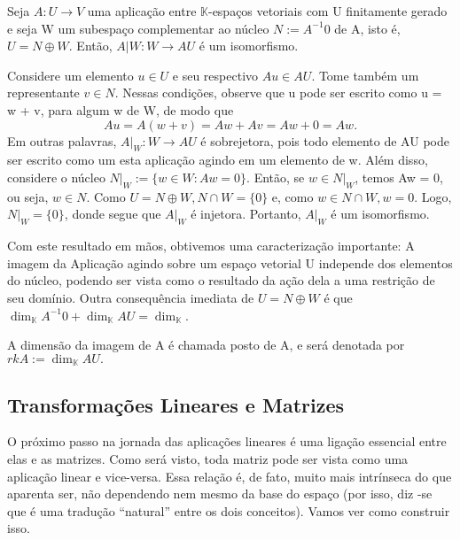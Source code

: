 \begin{proposition*}
    Seja $A:U\rightarrow{V}$ uma aplica\c c\~ao entre $\mathbb{K}$-espa\c cos vetoriais com U finitamente gerado e 
    seja W um subespa\c co complementar ao n\'ucleo $N:= A^{-1}0$ de A, isto \'e, $U = N \oplus W$. Ent\~ao, 
    $A|W: W \rightarrow AU$ \'e um isomorfismo.
\end{proposition*}
\begin{proof*}
    Considere um elemento $u\in{U}$ e seu respectivo $Au\in{AU}$. Tome tamb\'em um representante $v\in{N}$. Nessas
    condi\c c\~oes, observe que u pode ser escrito como u = w + v, para algum w de W, de modo que 
    $$
        Au = A(w + v) = Aw + Av = Aw + 0 = Aw.
    $$
    Em outras palavras, $A|_W: W\rightarrow AU$ \'e sobrejetora, pois todo elemento de AU pode ser escrito como
    um esta aplica\c c\~ao agindo em um elemento de w. Al\'em disso, considere o n\'ucleo $N|_W:=\{w\in{W}: Aw = 0\}.$
    Ent\~ao, se $w\in{N|_W}$, temos Aw = 0, ou seja, $w\in{N}.$ Como $U = N\oplus{W}, N\cap{W} = \{0\}$ e, como 
    $w\in{N\cap{W}}, w = 0.$ Logo, $N|_W = \{0\}$, donde segue que $A|_W$ \'e injetora. Portanto, $A|_W$ \'e um
    isomorfismo.
    \qedsymbol 
\end{proof*}
    Com este resultado em m\~aos, obtivemos uma caracteriza\c c\~ao importante: A imagem da Aplica\c c\~ao agindo
sobre um espa\c co vetorial U independe dos elementos do n\'ucleo, podendo ser vista como o resultado da a\c c\~ao
dela a uma restri\c c\~ao de seu dom\'inio. Outra consequ\^encia imediata de $U = N \oplus{W}$ \'e que 
$\dim_{\mathbb{K}}A^{-1}0 + \dim_{\mathbb{K}} AU = \dim_{\mathbb{K}}$.
\begin{def*}
    A dimens\~ao da imagem de A \'e chamada posto de A, e ser\'a denotada por $rkA:=\dim_{\mathbb{K}}AU.$
\end{def*}
\subsection{Transforma\c c\~oes Lineares e Matrizes}
    O pr\'oximo passo na jornada das aplica\c c\~oes lineares \'e uma liga\c c\~ao essencial entre elas e as matrizes.
Como ser\'a visto, toda matriz pode ser vista como uma aplica\c c\~ao linear e vice-versa. Essa rela\c c\~ao \'e,
de fato, muito mais intr\'inseca do que aparenta ser, n\~ao dependendo nem mesmo da base do espa\c co (por isso, diz
-se que \'e uma tradu\c c\~ao ``natural'' entre os dois conceitos). Vamos ver como construir isso.


